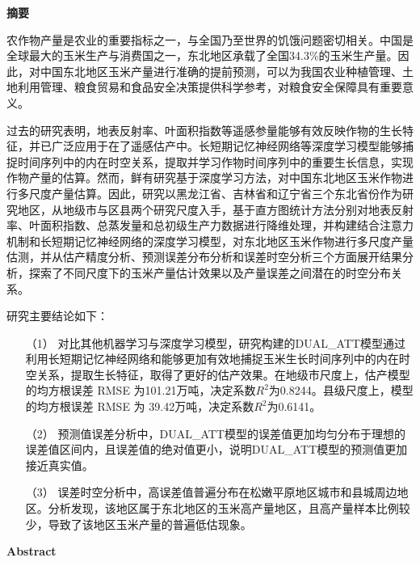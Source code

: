 \cleardoublepage{}
\begin{center}
    \bfseries {} 摘要
\end{center}

\par 农作物产量是农业的重要指标之一，与全国乃至世界的饥饿问题密切相关。中国是全球最大的玉米生产与消费国之一，东北地区承载了全国34.3\%的玉米生产量。因此，对中国东北地区玉米产量进行准确的提前预测，可以为我国农业种植管理、土地利用管理、粮食贸易和食品安全决策提供科学参考，对粮食安全保障具有重要意义。

\par 过去的研究表明，地表反射率、叶面积指数等遥感参量能够有效反映作物的生长特征，并已广泛应用于在了遥感估产中。长短期记忆神经网络等深度学习模型能够捕捉时间序列中的内在时空关系，提取并学习作物时间序列中的重要生长信息，实现作物产量的估算。然而，鲜有研究基于深度学习方法，对中国东北地区玉米作物进行多尺度产量估算。因此，研究以黑龙江省、吉林省和辽宁省三个东北省份作为研究地区，从地级市与区县两个研究尺度入手，基于直方图统计方法分别对地表反射率、叶面积指数、总蒸发量和总初级生产力数据进行降维处理，并构建结合注意力机制和长短期记忆神经网络的深度学习模型，对东北地区玉米作物进行多尺度产量估测，并从估产精度分析、预测误差分布分析和误差时空分析三个方面展开结果分析，探索了不同尺度下的玉米产量估计效果以及产量误差之间潜在的时空分布关系。

\par 研究主要结论如下：

\begin{itemize}
  \item [（1）] 对比其他机器学习与深度学习模型，研究构建的DUAL\_ATT模型通过利用长短期记忆神经网络和能够更加有效地捕捉玉米生长时间序列中的内在时空关系，提取生长特征，取得了更好的估产效果。在地级市尺度上，估产模型的均方根误差 RMSE 为101.21万吨，决定系数$R^2$为0.8244。县级尺度上，模型的均方根误差 RMSE 为 39.42万吨，决定系数$R^2$为0.6141。
  \item [（2）] 预测值误差分析中，DUAL\_ATT模型的误差值更加均匀分布于理想的误差值区间内，且误差值的绝对值更小，说明DUAL\_ATT模型的预测值更加接近真实值。
  \item [（3）] 误差时空分析中，高误差值普遍分布在松嫩平原地区城市和县城周边地区。分析发现，该地区属于东北地区的玉米高产量地区，且高产量样本比例较少，导致了该地区玉米产量的普遍低估现象。
\end{itemize}

\cleardoublepage{}
\begin{center}
    \bfseries {} Abstract
\end{center}

